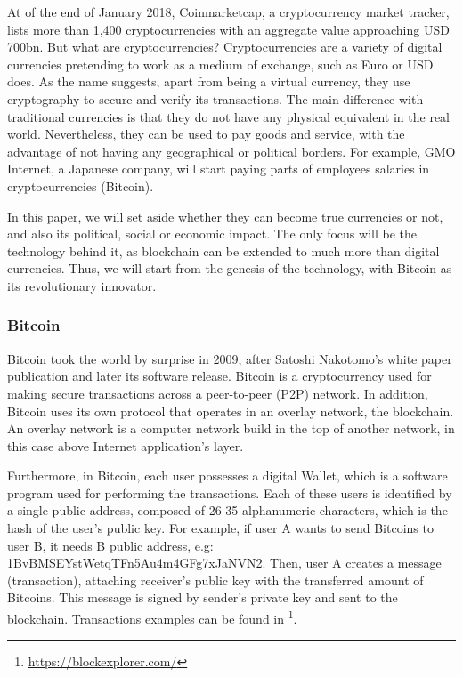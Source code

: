 At of the end of January 2018, Coinmarketcap, a cryptocurrency market tracker, lists more than 1,400 cryptocurrencies with an aggregate value approaching USD 700bn.  But what are cryptocurrencies? Cryptocurrencies are a variety of digital currencies pretending to work as a medium of exchange, such as Euro or USD does. As the name suggests, apart from being a virtual currency, they use cryptography to secure and verify its transactions. The main difference with traditional currencies is that they do not have any physical equivalent in the real world. Nevertheless, they can be used to pay goods and service, with the advantage of not having any geographical or political borders. For example, GMO Internet, a Japanese company, will start paying parts of employees salaries in cryptocurrencies (Bitcoin).

In this paper, we will set aside whether they can become true currencies or not, and also its political, social or economic impact. The only focus will be the technology behind it, as blockchain can be extended to much more than digital currencies. Thus, we will start from the genesis of the technology, with Bitcoin as its revolutionary innovator.


\subsubsection{Bitcoin}

Bitcoin took the world by surprise in 2009, after Satoshi Nakotomo's white paper publication \cite{nakamoto2008bitcoin} and later its software release. Bitcoin is a cryptocurrency used for making secure transactions across a peer-to-peer (P2P) network. In addition, Bitcoin uses its own protocol that operates in an overlay network, the blockchain. An overlay network is a computer network build in the top of another network, in this case above Internet application's layer.

Furthermore, in Bitcoin, each user possesses a digital Wallet, which is a software program used for performing the transactions. Each of these users is identified by a single public address, composed of 26-35 alphanumeric characters, which is the hash of the user's public key. For example, if user A wants to send Bitcoins to user B, it needs B public address, e.g: 1BvBMSEYstWetqTFn5Au4m4GFg7xJaNVN2. Then, user A creates a message (transaction), attaching receiver's public key with the transferred amount of Bitcoins. This message is signed by sender's private key and sent to the blockchain. Transactions examples can be found in \footnote{\url{https://blockexplorer.com/}}.

